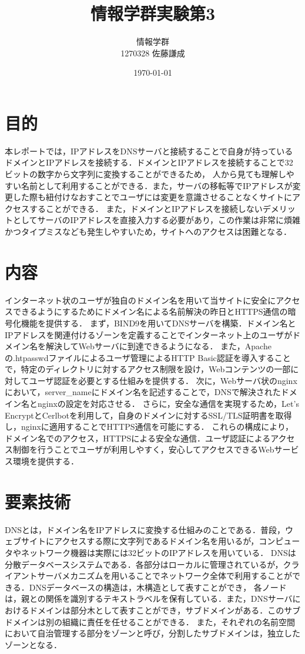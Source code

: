 \documentclass[divpdfmx]{jlreq}
\title{情報学群実験第3}
\author{情報学群 \\ 1270328 佐藤謙成}
\date{\today}
\begin{document}
\maketitle
\section{目的}
本レポートでは，IPアドレスをDNSサーバと接続することで自身が持っているドメインとIPアドレスを接続する．ドメインとIPアドレスを接続することで32ビットの数字から文字列に変換することができるため，
人から見ても理解しやすい名前として利用することができる．また，サーバの移転等でIPアドレスが変更した際も紐付けなおすことでユーザには変更を意識させることなくサイトにアクセスすることができる．
また，ドメインとIPアドレスを接続しないデメリットとしてサーバのIPアドレスを直接入力する必要があり，この作業は非常に煩雑かつタイプミスなども発生しやすいため，サイトへのアクセスは困難となる．
\section{内容}
インターネット状のユーザが独自のドメイン名を用いて当サイトに安全にアクセスできるようにするためにドメイン名による名前解決の昨日とHTTPS通信の暗号化機能を提供する．
まず，BIND9を用いてDNSサーバを構築．ドメイン名とIPアドレスを関連付けるゾーンを定義することでインターネット上のユーザがドメイン名を解決してWebサーバに到達できるようになる．
また，Apacheの.htpasswdファイルによるユーザ管理によるHTTP Basic認証を導入することで，特定のディレクトリに対するアクセス制限を設け，Webコンテンツの一部に対してユーザ認証を必要とする仕組みを提供する．
次に，Webサーバ状のnginxにおいて，server_nameにドメイン名を記述することで，DNSで解決されたドメイン名とnginxの設定を対応させる．
さらに，安全な通信を実現するため，Let's EncryptとCerlbotを利用して，自身のドメインに対するSSL/TLS証明書を取得し，nginxに適用することでHTTPS通信を可能にする．
これらの構成により，ドメイン名でのアクセス，HTTPSによる安全な通信．ユーザ認証によるアクセス制御を行うことでユーザが利用しやすく，安心してアクセスできるWebサービス環境を提供する．
\section{要素技術}
DNSとは，ドメイン名をIPアドレスに変換する仕組みのことである．普段，ウェブサイトにアクセスする際に文字列であるドメイン名を用いるが，コンピュータやネットワーク機器は実際には32ビットのIPアドレスを用いている．
DNSは分散データベースシステムである．各部分はローカルに管理されているが，クライアントサーバメカニズムを用いることでネットワーク全体で利用することができる．DNSデータベースの構造は，木構造として表すことができ，
各ノードは，親との関係を識別するテキストラベルを保有している．また，DNSサーバにおけるドメインは部分木として表すことができ，サブドメインがある．このサブドメインは別の組織に責任を任せることができる．
また，それぞれの名前空間において自治管理する部分をゾーンと呼び，分割したサブドメインは，独立したゾーンとなる．
\end{document}
